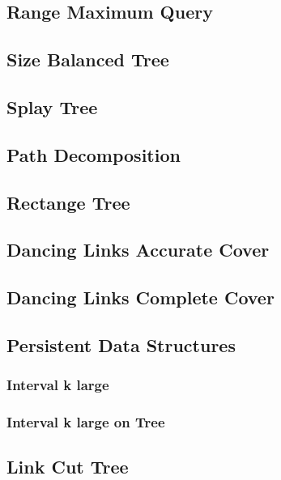 \documentclass[utf8,8pt]{article}
\begin{document}
\begin{CJK}{UTF8}{gbsn}
	\subsection{Range Maximum Query}
		
	\subsection{Size Balanced Tree}
		
	\subsection{Splay Tree}
		
	\subsection{Path Decomposition}
		
	\subsection{Rectange Tree}
		
	\subsection{Dancing Links Accurate Cover}
		
	\subsection{Dancing Links Complete Cover}
		
	\subsection{Persistent Data Structures}
		\subsubsection{Interval k large}
			
		\subsubsection{Interval k large on Tree}
			
	\subsection{Link Cut Tree}
		

\end{CJK}
\end{document}
